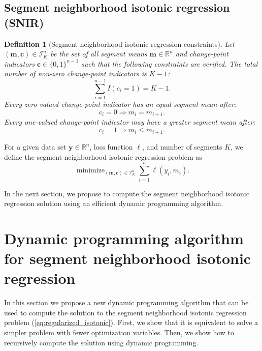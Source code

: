 \documentclass{article}
\newtheorem{definition}{Definition}
\DeclareMathOperator*{\minimize}{minimize}
\newcommand{\RR}{\mathbb R}
\begin{document}
\subsection{Segment neighborhood isotonic regression (SNIR)}

\begin{definition}[Segment neighborhood isotonic regression constraints]
  \label{def:I}
  Let $(\mathbf m, \mathbf c)\in\mathcal I_K^n$ be the set of all segment means
  $\mathbf m\in\RR^n$ and change-point indicators
  $\mathbf c\in\{0,1\}^{n-1}$ such that the following constraints are
  verified. The total number of non-zero change-point indicators is $K-1$:
  \begin{equation}
    \label{eq:isotonic_segments}
    \sum_{i=1}^{n-1} I(c_i = 1) = K-1.
  \end{equation}
  Every zero-valued change-point indicator has an equal segment mean
  after:
  \begin{equation}
    \label{eq:isotonic_0}
    c_i = 0 \Rightarrow m_i = m_{i+1}.
  \end{equation}
  Every one-valued change-point indicator may have a greater segment
  mean after:
  \begin{equation}
    \label{eq:isotonic_1}
    c_i = 1 \Rightarrow m_i \leq m_{i+1}.
  \end{equation}
\end{definition}

For a given data set $\mathbf y\in\RR^n$, loss function $\ell$, and
number of segments $K$, we define the segment neighborhood isotonic regression
problem as
\begin{equation}
  \label{eq:regularized_isotonic}
  \minimize_{(\mathbf m, \mathbf c)\in\mathcal I_K^n} \sum_{i=1}^n \ell(y_i, m_i).
\end{equation}

In the next section, we propose to compute the segment neighborhood isotonic regression solution
using an efficient dynamic programming algorithm.

\newcommand{\FCC}{\widetilde{C}}
\newcommand{\M}{\mathcal{M}}
\section{Dynamic programming algorithm for segment neighborhood isotonic regression}

In this section we propose a new dynamic programming algorithm that
can be used to compute the solution to the segment neighborhood isotonic
regression problem (\ref{eq:regularized_isotonic}). First, we show
that it is equivalent to solve a simpler problem with fewer
optimization variables. Then, we show how to recursively compute the
solution using dynamic programming.
\end{document}
